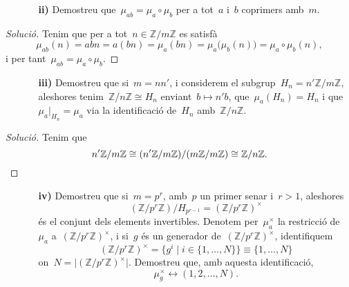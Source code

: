 \documentclass[a4paper]{article}
\newcommand{\ZZ}{\mathbb{Z}}
\newenvironment{solution}{
    \renewcommand\qedsymbol{\ensuremath{\lozenge}}
    \begin{proof}[Solució]
        }{
    \end{proof}
}
\begin{document}
\clearpage

\begin{enumerate}
    \item[] \begin{enumerate}
        \item[\textbf{ii)}] Demostreu que~\(\mu_{ab} = \mu_{a}\circ\mu_{b}\) per
            a tot~\(a\) i~\(b\) coprimers amb~\(m\).
    \end{enumerate}
\end{enumerate}

\begin{solution}
    Tenim que per a tot~\(n\in\ZZ/m\ZZ\) es satisfà
    \[
        \mu_{ab}(n)
        = abn
        = a(bn)
        = \mu_{a}(bn)
        = \mu_{a}\bigl(\mu_{b}(n)\bigr)
        = \mu_{a}\circ\mu_{b}(n),
    \]
    i per tant~\(\mu_{ab} = \mu_{a}\circ\mu_{b}\).
\end{solution}

\begin{enumerate}
    \item[] \begin{enumerate}
        \item[\textbf{iii)}] Demostreu que si~\(m=nn'\),
            i considerem el subgrup~\(H_{n}=n'\ZZ/m\ZZ\),
            aleshores tenim~\(\ZZ/n\ZZ \cong H_{n}\)
            enviant~\(b\mapsto n'b\),
            que~\(\mu_{a}(H_{n})=H_{n}\)
            i que~\(\mu_{a}\rvert_{H_{n}}=\mu_{a}\)
            via la identificació de~\(H_{n}\)
            amb~\(\ZZ/n\ZZ\).
    \end{enumerate}
\end{enumerate}

\begin{solution}
    Tenim que
    \[
        n'\ZZ/m\ZZ
        \cong
        (n'\ZZ/m\ZZ)/(m\ZZ/m\ZZ)
        \cong
        \ZZ/n\ZZ.
        \qedhere
    \]
\end{solution}

\begin{enumerate}
    \item[] \begin{enumerate}
        \item[\textbf{iv)}] Demostreu que si~\(m=p^{r}\),
            amb~\(p\) un primer senar
            i~\(r>1\), aleshores
            \[
                (\ZZ/p^{r}\ZZ)/H_{p^{r-1}} = (\ZZ/p^{r}\ZZ)^{\times}
            \]
            és el conjunt dels elements invertibles.
            Denotem per~\(\mu_{a}^{\times}\)
            la restricció de~\(\mu_{a}\) a~\((\ZZ/p^{r}\ZZ)^{\times}\),
            i si~\(g\) és un generador de~\((\ZZ/p^{r}\ZZ)^{\times}\),
            identifiquem
            \[
                (\ZZ/p^{r}\ZZ)^{\times}
                =
                \{ g^{i} \mid i\in \{1,\dots,N\}\}
                \equiv
                \{1,\dots,N\}
            \]
            on~\(N = \lvert(\ZZ/p^{r}\ZZ)^{\times}\rvert\).
            Demostreu que, amb aquesta identificació,
            \[
                \mu_{g}^{\times} \leftrightarrow (1,2,\dots,N).
            \]
    \end{enumerate}
\end{enumerate}
\end{document}
